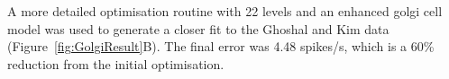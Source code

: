 A more detailed optimisation routine with 22 levels and an enhanced
golgi cell model was used to generate a closer fit to the Ghoshal and
Kim data (Figure~\ref{fig:GolgiResult}B).  The final error was 4.48
spikes/s, which is a 60\% reduction from the initial optimisation. 
















